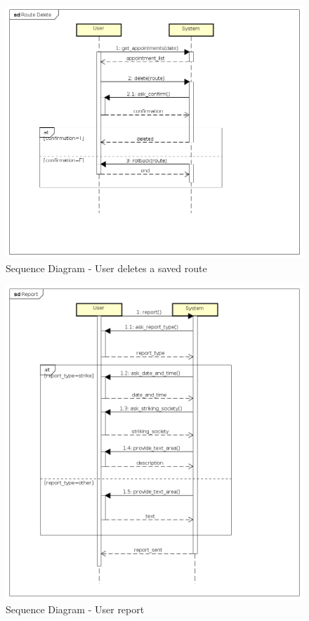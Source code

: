 \begin{figure}
	\centering
	\includegraphics{Images/SequenceDiagrams/8_Route_Delete.png}
	\caption{\label{fig: sequenceDiagram8}Sequence Diagram - User deletes a saved route }
\end{figure}

\begin{figure}
	\centering
	\includegraphics[totalheight = \textheight]{Images/SequenceDiagrams/9_Report.png}
	\caption{\label{fig: sequenceDiagram9}Sequence Diagram - User report }
\end{figure}

